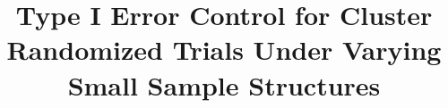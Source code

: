 \documentclass[twocolumn]{bmcart}%
\begin{document}
\begin{frontmatter}

\begin{fmbox}


\title{Type I Error Control for Cluster Randomized Trials Under Varying Small Sample Structures}


\author[
   addressref={aff1},                   %
]{ }
\author[
   addressref={aff1},
   corref={aff1},                       %
   email={ken.kleinman@gmail.com}   %
]{ }


\address[id=aff1]{%
  , %
  ,                     %
  ,                              %
}



\end{fmbox}
\end{frontmatter}
\end{document}
